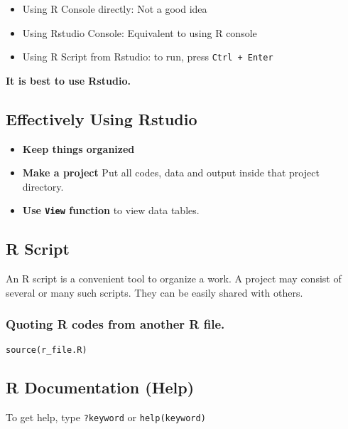 \documentclass[
]{book}
\providecommand{\tightlist}{%
  \setlength{\itemsep}{0pt}\setlength{\parskip}{0pt}}
\begin{document}
\begin{itemize}
\tightlist
\item
  Using R Console directly: Not a good idea
\item
  Using Rstudio Console: Equivalent to using R console
\item
  Using R Script from Rstudio: to run, press \texttt{Ctrl\ +\ Enter}
\end{itemize}

\textbf{It is best to use Rstudio.}

\hypertarget{effectively-using-rstudio}{%
\subsection{Effectively Using Rstudio}\label{effectively-using-rstudio}}

\begin{itemize}
\tightlist
\item
  \textbf{Keep things organized}
\item
  \textbf{Make a project} Put all codes, data and output inside that project directory.
\item
  \textbf{Use \texttt{View} function} to view data tables.
\end{itemize}

\hypertarget{r-script}{%
\subsection{R Script}\label{r-script}}

An R script is a convenient tool to organize a work. A project may consist of several or many such scripts. They can be easily shared with others.

\hypertarget{quoting-r-codes-from-another-r-file.}{%
\subsubsection{Quoting R codes from another R file.}\label{quoting-r-codes-from-another-r-file.}}

\texttt{source(\textquotesingle{}r\_file.R\textquotesingle{})}

\hypertarget{r-documentation-help}{%
\subsection{R Documentation (Help)}\label{r-documentation-help}}

To get help, type \texttt{?keyword} or \texttt{help(keyword)}
\end{document}
